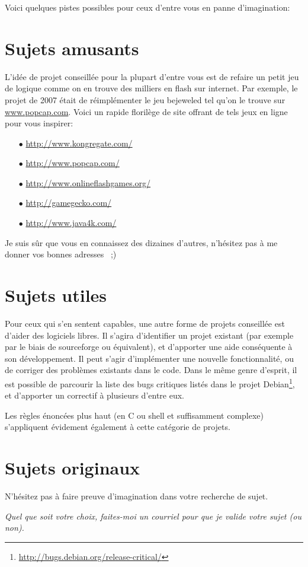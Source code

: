 \documentclass[10pt]{article}
\begin{document}
\bigskip
Voici quelques pistes possibles pour ceux d'entre vous en panne d'imagination:
\vspace{-\baselineskip}
\section*{Sujets amusants}\vspace{-.5\baselineskip}
L'idée de projet conseillée pour la plupart d'entre vous est de refaire un
petit jeu de logique comme on en trouve des milliers en flash sur internet. Par
exemple, le projet de 2007 était de réimplémenter le jeu bejeweled tel
qu'on le trouve sur \url{www.popcap.com}. Voici un rapide florilège de site
offrant de tels jeux en ligne pour vous inspirer:
\begin{itemize}
\item[$\bullet$] \url{http://www.kongregate.com/}
\item[$\bullet$] \url{http://www.popcap.com/}
\item[$\bullet$] \url{http://www.onlineflashgames.org/}
\item[$\bullet$] \url{http://gamegecko.com/}
\item[$\bullet$] \url{http://www.java4k.com/}
\end{itemize}
Je suis sûr que vous en connaissez des dizaines d'autres, n'hésitez pas à me
donner vos bonnes adresses~ ;)

\vspace{-.5\baselineskip}\section*{Sujets utiles}\vspace{-.5\baselineskip}
Pour ceux qui s'en sentent capables, une autre forme de projets conseillée est
d'aider des logiciels libres. Il s'agira d'identifier un projet existant (par
exemple par le biais de sourceforge ou équivalent), et d'apporter une aide
conséquente à son développement. Il peut s'agir d'implémenter une nouvelle
fonctionnalité, ou de corriger des problèmes existants dans le code.
%
Dans le même genre d'esprit, il est possible de parcourir la liste des
bugs critiques listés dans le projet
Debian\footnote{\url{http://bugs.debian.org/release-critical/}}, et
d'apporter un correctif à plusieurs d'entre eux.

Les règles énoncées plus haut (en C ou shell et suffisamment complexe)
s'appliquent évidement également à cette catégorie de projets.

\vspace{-.5\baselineskip}\section*{Sujets originaux}\vspace{-.5\baselineskip}

N'hésitez pas à faire preuve d'imagination dans votre recherche de
sujet. 

\medskip
\centerline{\textit{Quel que soit votre choix, faites-moi un courriel
pour que je valide votre sujet (ou non).}}
\end{document}
